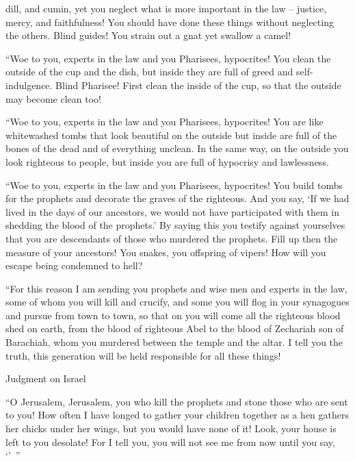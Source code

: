{dill,
and cumin,
yet you neglect
what is more important
in the
law
– justice,
mercy,
and
faithfulness! You should
have done
these things
without
neglecting the others.
Blind
guides! You strain out
a gnat
yet swallow
a camel!
\par }{\PP {}“Woe
to you,
experts in the law
and
you Pharisees,
hypocrites! You clean
the outside
of the cup
and
the dish,
but
inside
they are full
of
greed
and
self-indulgence.
Blind
Pharisee! First
clean
the inside
of the cup,
so that the outside
may
become
clean too!
\par }{\PP {}“Woe
to you,
experts in the law
and
you Pharisees,
hypocrites! You are like
whitewashed
tombs
that
look
beautiful
on the outside
but
inside
are full
of the bones
of the dead
and
of everything
unclean.
In the same way,
on the outside
you
look
righteous
to people,
but
inside
you are
full
of hypocrisy
and
lawlessness.
\par }{\PP {}“Woe
to you,
experts in the law
and
you Pharisees,
hypocrites! You build
tombs
for the prophets
and
decorate
the graves
of the righteous.
And
you say,
‘If
we had lived
in
the days
of our
ancestors,
we would
not
have participated
with them
in
shedding
the blood
of the prophets.’
By saying this
you testify
against yourselves
that
you are
descendants
of those who murdered
the prophets.
Fill up
then
the measure
of your
ancestors!
You snakes,
you offspring
of vipers! How
will you escape
being condemned
to hell?
\par }{\PP {}“For
this
reason I
am sending
you
prophets
and
wise men
and
experts in the law,
some of
whom
you will kill
and
crucify,
and
some
you will flog
in
your
synagogues
and
pursue
from
town
to
town,
so
that on
you
will come
all
the righteous
blood
shed
on
earth,
from
the blood
of righteous
Abel
to the blood
of Zechariah
son
of Barachiah,
whom
you murdered
between
the temple
and
the altar.
I tell
you
the truth,
this
generation
will be held responsible
for all
these things!
\par }{\SH Judgment on Israel
\par }{\PP {}“O Jerusalem,
Jerusalem,
you who kill
the prophets
and
stone
those who are sent
to
you! How often
I have longed
to gather
your
children
together
as
a hen
gathers
her
chicks
under
her wings,
but
you would
have none of it!
Look,
your
house
is left
to you
desolate!
For
I tell
you,
you will not see me from now until you say, ‘{}’ ”

}
